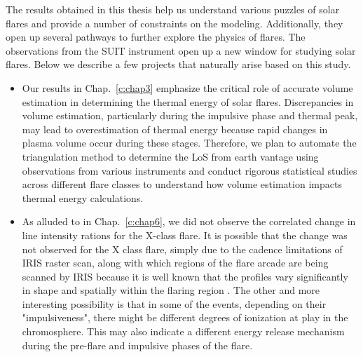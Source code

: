 The results obtained in this thesis help us understand various puzzles of solar flares and provide a number of constraints on the modeling. Additionally, they open up several pathways to further explore the physics of flares. The observations from the SUIT instrument open up a new window for studying solar flares. Below we describe a few projects that naturally arise based on this study. 

\begin{itemize}[label=]

\item Our results in Chap.~\ref{c:chap3} emphasize the critical role of accurate volume estimation in determining the thermal energy of solar flares. Discrepancies in volume estimation, particularly during the impulsive phase and thermal peak, may lead to overestimation of thermal energy because rapid changes in plasma volume occur during these stages. Therefore, we plan to automate the triangulation method to determine the LoS from earth vantage using observations from various instruments and conduct rigorous statistical studies across different flare classes to understand how volume estimation impacts thermal energy calculations. 

        
\item As alluded to in Chap.~\ref{c:chap6}, we did not observe the correlated change in line intensity rations for the X-class flare. It is possible that the change was not observed for the X class flare, simply due to the cadence limitations of IRIS raster scan, along with which regions of the flare arcade are being scanned by IRIS because it is well known that the  profiles vary significantly in shape and spatially within the flaring region \citep{panos18,dalda23}. The other and more interesting possibility is that in some of the events, depending on their "impulsiveness", there might be different degrees of ionization at play in the chromosphere. This may also indicate a different energy release mechanism during the pre-flare and impulsive phases of the flare.


\end{itemize}
